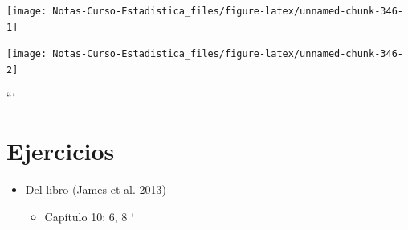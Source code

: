 \documentclass[
  12pt,
]{book}
\newenvironment{Shaded}{\begin{snugshade}}{\end{snugshade}}
\newcommand{\DecValTok}[1]{\textcolor[rgb]{0.00,0.00,0.81}{#1}}
\newcommand{\FunctionTok}[1]{\textcolor[rgb]{0.00,0.00,0.00}{#1}}
\newcommand{\NormalTok}[1]{#1}
\newcommand{\SpecialCharTok}[1]{\textcolor[rgb]{0.00,0.00,0.00}{#1}}
\providecommand{\tightlist}{%
  \setlength{\itemsep}{0pt}\setlength{\parskip}{0pt}}
\begin{document}
\begin{center}\texttt{[image: Notas-Curso-Estadistica\_files/figure-latex/unnamed-chunk-346-1]} \end{center}

\begin{Shaded}
\end{Shaded}

\begin{center}\texttt{[image: Notas-Curso-Estadistica\_files/figure-latex/unnamed-chunk-346-2]} \end{center}

```

\hypertarget{ejercicios-7}{%
\section{Ejercicios}\label{ejercicios-7}}

\begin{itemize}
\tightlist
\item
  Del libro (James et al. 2013)

  \begin{itemize}
  \tightlist
  \item
    Capítulo 10: 6, 8 `
  \end{itemize}
\end{itemize}
\end{document}
